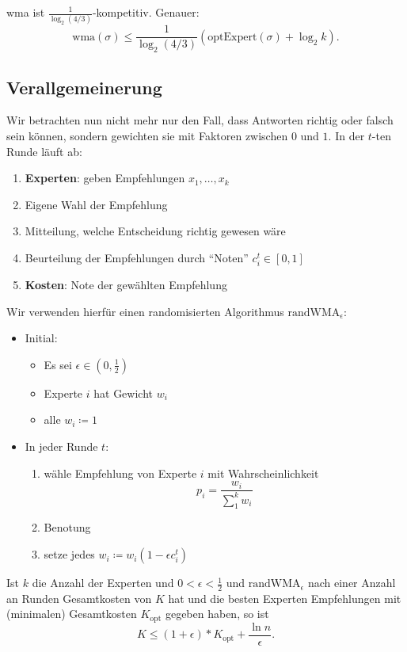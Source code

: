 wma ist \( \frac{1}{\log_2 (4/3)} \)-kompetitiv. Genauer:
\begin{equation*}
  \text{wma}(\sigma) \leq \frac{1}{\log_2 (4/3)}(\text{optExpert}(\sigma) + \log_2 k)\text{.}
\end{equation*}

\subsection{Verallgemeinerung}

Wir betrachten nun nicht mehr nur den Fall, dass Antworten richtig oder falsch sein können, sondern gewichten sie mit Faktoren zwischen \( 0 \) und \( 1 \). In der \( t \)-ten Runde läuft ab:

\begin{enumerate}
  \item \textbf{Experten}: geben Empfehlungen \( x_1, \dots, x_k \)
  \item Eigene Wahl der Empfehlung
  \item Mitteilung, welche Entscheidung richtig gewesen wäre
  \item Beurteilung der Empfehlungen durch ``Noten'' \( c_i^t \in [0,1] \)
  \item \textbf{Kosten}: Note der gewählten Empfehlung
\end{enumerate}

Wir verwenden hierfür einen randomisierten Algorithmus \( \text{randWMA}_\epsilon \):
\begin{itemize}
  \item Initial:
  \begin{itemize}
    \item Es sei \( \epsilon \in (0,\tfrac{1}{2}) \)
    \item Experte \( i \) hat Gewicht \( w_i \)
    \item alle \( w_i \coloneqq 1 \)
  \end{itemize}
  \item In jeder Runde \( t \):
  \begin{enumerate}
    \item wähle Empfehlung von Experte \( i \) mit Wahrscheinlichkeit
    \begin{equation*}
      p_i = \frac{w_i}{\sum_1^k w_i}
    \end{equation*}
    \item Benotung
    \item setze jedes \( w_i \coloneqq w_i(1-\epsilon c_i^t) \)
  \end{enumerate}
\end{itemize}

Ist \( k \) die Anzahl der Experten und \( 0 < \epsilon < \frac{1}{2} \) und \( \text{randWMA}_\epsilon \) nach einer Anzahl an Runden Gesamtkosten von \( K \) hat und die besten Experten Empfehlungen mit (minimalen) Gesamtkosten \( K_\text{opt} \) gegeben haben, so ist
\begin{equation*}
  K \leq (1+\epsilon)*K_\text{opt} + \frac{\ln n}{\epsilon}\text{.}
\end{equation*}
